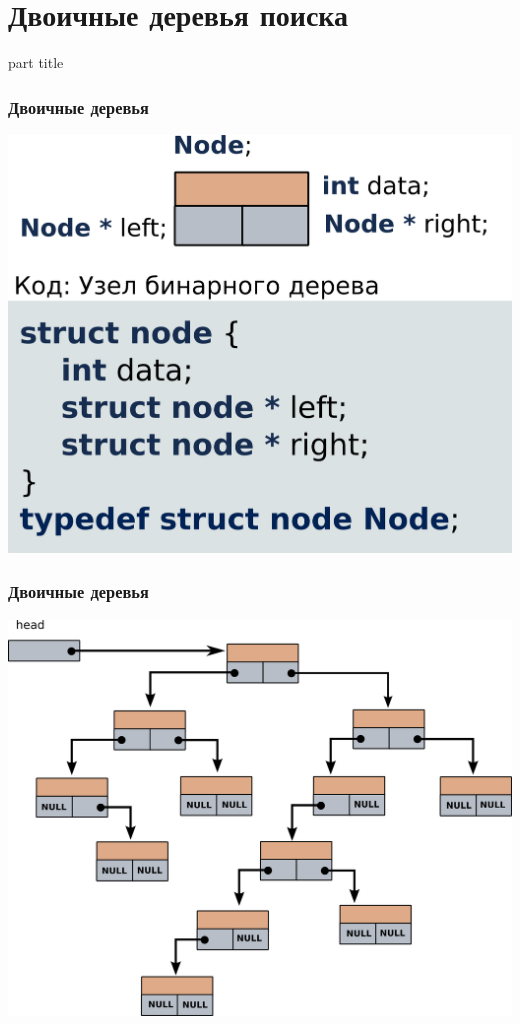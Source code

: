 \documentclass[14pt,pdf,hyperref={unicode}]{beamer}
\begin{document}
\section{Двоичные деревья поиска}
\begin{frame}
\begin{center}
\begin{beamercolorbox}[sep=8pt,center]{part
title}
\insertsection
\end{beamercolorbox}
\end{center}
\end{frame}

\begin{frame}[fragile]
\frametitle{Двоичные деревья} 
\begin{center}
\includegraphics[width=0.6\linewidth]{images/bintree_initial.png}
\end{center}
\end{frame}
\begin{frame}[fragile]
\frametitle{Двоичные деревья}  
\begin{center}
\includegraphics[width=0.75\linewidth]{images/bintree_initial_2.png}
\end{center}
\end{frame}
\end{document}
